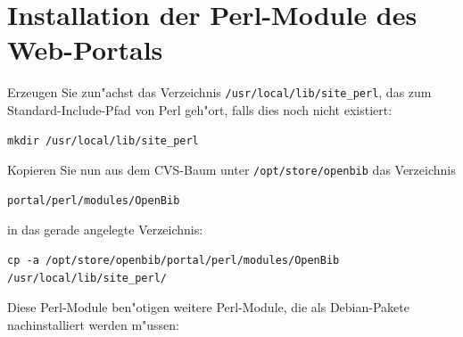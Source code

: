 \documentclass[11pt, twoside, a4paper, BCOR8mm, DIV12, bibtotoc,idxtotoc]{scrbook}
\begin{document}
\section{Installation der Perl-Module des Web-Portals}

Erzeugen Sie zun"achst das Verzeichnis \texttt{/usr/local/lib/site\_perl}, das
zum Standard-Include-Pfad von Perl geh"ort, falls dies noch nicht
existiert:

\begin{verbatim}
mkdir /usr/local/lib/site_perl
\end{verbatim}

Kopieren Sie nun aus dem CVS-Baum unter \texttt{/opt/store/openbib}
das Verzeichnis 

\begin{verbatim}
portal/perl/modules/OpenBib
\end{verbatim}

in das gerade angelegte Verzeichnis:

\begin{verbatim}
cp -a /opt/store/openbib/portal/perl/modules/OpenBib /usr/local/lib/site_perl/
\end{verbatim}

Diese Perl-Module ben"otigen weitere Perl-Module, die als
Debian-Pakete nachinstalliert werden m"ussen:
\end{document}
